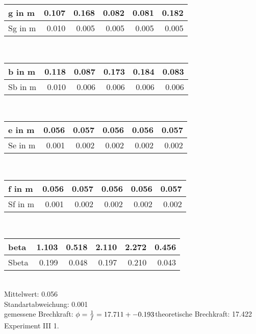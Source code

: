 	\begin{tabular}{| l | r|r|r|r|r|}
	\hline
        g in m& 0.107 & 0.168 & 0.082 & 0.081 & 0.182 \\ \hline Sg in m& 0.010 & 0.005 & 0.005 & 0.005 & 0.005 \\ \hline
	\end{tabular} \\ \vspace{3 mm} \normalsize \vspace{3 mm}
	\begin{tabular}{| l | r|r|r|r|r|}
	\hline
        b in m& 0.118 & 0.087 & 0.173 & 0.184 & 0.083 \\ \hline Sb in m& 0.010 & 0.006 & 0.006 & 0.006 & 0.006 \\ \hline
	\end{tabular} \\ \vspace{3 mm} \normalsize \vspace{3 mm}
	\begin{tabular}{| l | r|r|r|r|r|}
	\hline
        e in m& 0.056 & 0.057 & 0.056 & 0.056 & 0.057 \\ \hline Se in m& 0.001 & 0.002 & 0.002 & 0.002 & 0.002 \\ \hline
	\end{tabular} \\ \vspace{3 mm} \normalsize \vspace{3 mm}
	\begin{tabular}{| l | r|r|r|r|r|}
	\hline
        f in m& 0.056 & 0.057 & 0.056 & 0.056 & 0.057 \\ \hline Sf in m& 0.001 & 0.002 & 0.002 & 0.002 & 0.002 \\ \hline
	\end{tabular} \\ \vspace{3 mm} \normalsize \vspace{3 mm}
	\begin{tabular}{| l | r|r|r|r|r|}
	\hline
        beta& 1.103 & 0.518 & 2.110 & 2.272 & 0.456 \\ \hline Sbeta& 0.199 & 0.048 & 0.197 & 0.210 & 0.043 \\ \hline
	\end{tabular} \\ Mittelwert: 0.056\\Standartabweichung: 0.001\\gemessene Brechkraft: $\phi=\frac{1}{f}=17.711 +- 0.193\\ $theoretische Brechkraft: 17.422\\ Experiment III 1.\\ \vspace{3 mm} \normalsize \vspace{3 mm}

